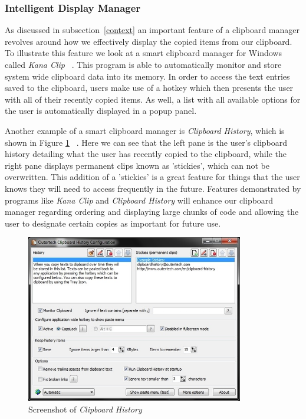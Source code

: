 \documentclass{acm_proc_article-sp}
\begin{document}
\subsubsection{Intelligent Display Manager}\label{display}
As discussed in subsection~\ref{context} an important feature of a clipboard manager revolves around how we effectively display the copied items from our clipboard. To illustrate this feature we look at a smart clipboard manager for Windows called \textit{Kana Clip} ~\cite{KanaClip}. This program is able to automatically monitor and store system wide clipboard data into its memory. In order to access the text entries saved to the clipboard, users make use of a hotkey which then presents the user with all of their recently copied items. As well, a list with all available options for the user is automatically displayed in a popup panel. 

Another example of a smart clipboard manager is \textit{Clipboard History}, which is shown in Figure \ref{fig:Clip_History} ~\cite{ClipHistory}. Here we can see that the left pane is the user's clipboard history detailing what the user has recently copied to the clipboard, while the right pane displays permanent clips known as 'stickies', which can not be overwritten. This addition of a 'stickies' is a great feature for things that the user knows they will need to access frequently in the future. Features demonstrated by programs like \textit{Kana Clip} and \textit{Clipboard History} will enhance our clipboard manager regarding ordering and displaying large chunks of code and allowing the user to designate certain copies as important for future use.

\begin{figure}[h]
\centering
\includegraphics[width=9.5cm]{ClipHistory}
\caption{Screenshot of \textit{Clipboard History}}
\label{fig:Clip_History}
\end{figure} 
\end{document}
